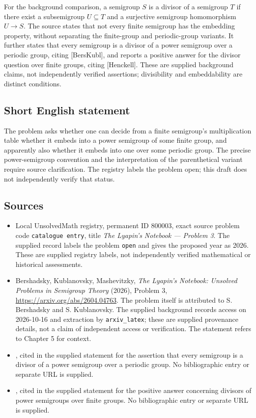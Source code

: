 \documentclass[11pt]{article}
\begin{document}
For the background comparison, a semigroup \(S\) is a divisor of a semigroup \(T\) if there exist a subsemigroup \(U\subseteq T\) and a surjective semigroup homomorphism \(U\to S\). The source states that not every finite semigroup has the embedding property, without separating the finite-group and periodic-group variants. It further states that every semigroup is a divisor of a power semigroup over a periodic group, citing [BersKubl], and reports a positive answer for the divisor question over finite groups, citing [Henckell]. These are supplied background claims, not independently verified assertions; divisibility and embeddability are distinct conditions.
\subsection{Short English statement}
The problem asks whether one can decide from a finite semigroup's multiplication table whether it embeds into a power semigroup of some finite group, and apparently also whether it embeds into one over some periodic group. The precise power-semigroup convention and the interpretation of the parenthetical variant require source clarification. The registry labels the problem open; this draft does not independently verify that status.
\subsection{Sources}
\begin{itemize}
\item Local UnsolvedMath registry, permanent ID \(800003\), exact source problem code \texttt{catalogue entry}, title \emph{The Lyapin's Notebook --- Problem 3}. The supplied record labels the problem \texttt{open} and gives the proposed year as 2026. These are supplied registry labels, not independently verified mathematical or historical assessments.
\item Bershadsky, Kublanovsky, Mashevitzky, \emph{The Lyapin's Notebook: Unsolved Problems in Semigroup Theory} (2026), Problem 3, \url{https://arxiv.org/abs/2604.04763}. The problem itself is attributed to S. Bershadsky and S. Kublanovsky. The supplied background records access on 2026-10-16 and extraction by \texttt{arxiv\_latex}; these are supplied provenance details, not a claim of independent access or verification. The statement refers to Chapter 5 for context.
\item [BersKubl], cited in the supplied statement for the assertion that every semigroup is a divisor of a power semigroup over a periodic group. No bibliographic entry or separate URL is supplied.
\item [Henckell], cited in the supplied statement for the positive answer concerning divisors of power semigroups over finite groups. No bibliographic entry or separate URL is supplied.
\end{itemize}
\end{document}
